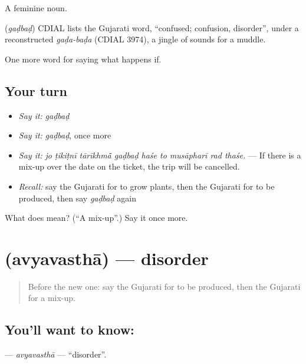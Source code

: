 A feminine noun.

\begin{cousinweb}
\textbf{} (\emph{gaḍbaḍ}) CDIAL lists the Gujarati word, \textquotedblleft{}confused; confusion, disorder\textquotedblright{}, under a reconstructed \emph{gaḍa-baḍa} (CDIAL 3974), a jingle of sounds for a muddle.
\end{cousinweb}

\begin{grammarlens}[title={What you've built}]
One more word for saying what happens if.
\end{grammarlens}

\subsection*{Your turn}
\begin{itemize}
\raggedright
  \item \emph{Say it:} \emph{gaḍbaḍ}
  \item \emph{Say it:} \emph{gaḍbaḍ}, once more
  \item \emph{Say it:} \emph{jo ṭikiṭnī tārīkhmā̃ gaḍbaḍ haśe to musāpharī rad thaśe.} — If there is a mix-up over the date on the ticket, the trip will be cancelled.
  \item \emph{Recall:} say the Gujarati for to grow plants, then the Gujarati for to be produced, then say \emph{gaḍbaḍ} again
\end{itemize}

\begin{tcolorbox}[breakable,colback=teal!4,colframe=teal!35!black,title={Before you move on}]
What does  mean? (\textquotedblleft{}A mix-up\textquotedblright{}.) Say it once more.
\end{tcolorbox}
\section[\texorpdfstring{\gu{અવ્યવસ્થા} (avyavasthā)}{અવ્યવસ્થા (avyavasthā)}]{ (avyavasthā) — disorder}

\label{lesson:GU-C391-avyavastha}



\begin{quote}
Before the new one: say the Gujarati for to be produced, then the Gujarati for a mix-up.
\end{quote}

\subsection*{You'll want to know: }
\textbf{} — \emph{avyavasthā} — \textquotedblleft{}disorder\textquotedblright{}.


